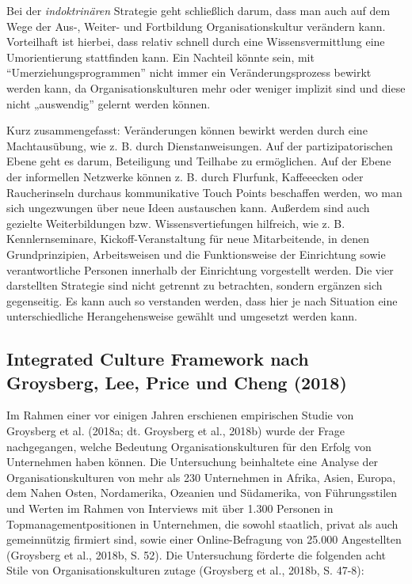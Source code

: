 \documentclass[
  letterpaper,
]{book}
\begin{document}
Bei der \emph{indoktrinären} Strategie geht schließlich darum, dass man
auch auf dem Wege der Aus-, Weiter- und Fortbildung Organisationskultur
verändern kann. Vorteilhaft ist hierbei, dass relativ schnell durch eine
Wissensvermittlung eine Umorientierung stattfinden kann. Ein Nachteil
könnte sein, mit ``Umerziehungsprogrammen'' nicht immer ein
Veränderungsprozess bewirkt werden kann, da Organisationskulturen mehr
oder weniger implizit sind und diese nicht „auswendig'' gelernt werden
können.

Kurz zusammengefasst: Veränderungen können bewirkt werden durch eine
Machtausübung, wie z. B. durch Dienstanweisungen. Auf der
partizipatorischen Ebene geht es darum, Beteiligung und Teilhabe zu
ermöglichen. Auf der Ebene der informellen Netzwerke können z. B. durch
Flurfunk, Kaffeeecken oder Raucherinseln durchaus kommunikative Touch
Points beschaffen werden, wo man sich ungezwungen über neue Ideen
austauschen kann. Außerdem sind auch gezielte Weiterbildungen bzw.
Wissensvertiefungen hilfreich, wie z. B. Kennlernseminare,
Kickoff-Veranstaltung für neue Mitarbeitende, in denen Grundprinzipien,
Arbeitsweisen und die Funktionsweise der Einrichtung sowie
verantwortliche Personen innerhalb der Einrichtung vorgestellt werden.
Die vier darstellten Strategie sind nicht getrennt zu betrachten,
sondern ergänzen sich gegenseitig. Es kann auch so verstanden werden,
dass hier je nach Situation eine unterschiedliche Herangehensweise
gewählt und umgesetzt werden kann.

\subsection{Integrated Culture Framework nach Groysberg, Lee, Price und
Cheng
(2018)}\label{integrated-culture-framework-nach-groysberg-lee-price-und-cheng-2018}

Im Rahmen einer vor einigen Jahren erschienen empirischen Studie von
Groysberg et al. (2018a; dt. Groysberg et al., 2018b) wurde der Frage
nachgegangen, welche Bedeutung Organisationskulturen für den Erfolg von
Unternehmen haben können. Die Untersuchung beinhaltete eine Analyse der
Organisationskulturen von mehr als 230 Unternehmen in Afrika, Asien,
Europa, dem Nahen Osten, Nordamerika, Ozeanien und Südamerika, von
Führungsstilen und Werten im Rahmen von Interviews mit über 1.300
Personen in Topmanagementpositionen in Unternehmen, die sowohl
staatlich, privat als auch gemeinnützig firmiert sind, sowie einer
Online-Befragung von 25.000 Angestellten (Groysberg et al., 2018b, S.
52). Die Untersuchung förderte die folgenden acht Stile von
Organisationskulturen zutage (Groysberg et al., 2018b, S. 47-8):
\end{document}
